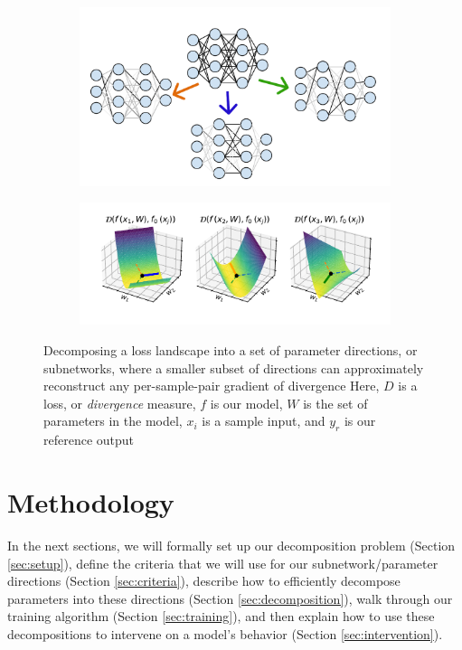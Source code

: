 \documentclass{article}
\theoremstyle{plain}
\theoremstyle{definition}
\theoremstyle{remark}
\begin{document}
\begin{figure}
    \begin{subfigure}{\columnwidth}
        \centering
        \includegraphics[width=.7\textwidth]{../figures/1b_jacobian_diagram.pdf}
    \end{subfigure}
    \begin{subfigure}{\columnwidth}
        \centering
        \includegraphics[width=\textwidth]{../figures/1a_jacobian_diagram.pdf}
    \end{subfigure} \caption{Decomposing a loss landscape into a set of parameter directions, or subnetworks, where a smaller subset of directions can approximately reconstruct any per-sample-pair gradient of divergence Here, $D$ is a loss, or \textit{divergence} measure, $f$ is our model, $W$ is the set of parameters in the model, $x_i$ is a sample input, and $y_r$ is our reference output}\label{fig:1_jacobian_diagram}
    
\end{figure}


\section{Methodology}\label{sec:methods}

In the next sections, we will formally set up our decomposition problem (Section \ref{sec:setup}), define the criteria that we will use for our subnetwork/parameter directions (Section \ref{sec:criteria}), describe how to efficiently decompose parameters into these directions (Section \ref{sec:decomposition}), walk through our training algorithm (Section \ref{sec:training}), and then explain how to use these decompositions to intervene on a model's behavior (Section \ref{sec:intervention}). 
\end{document}
